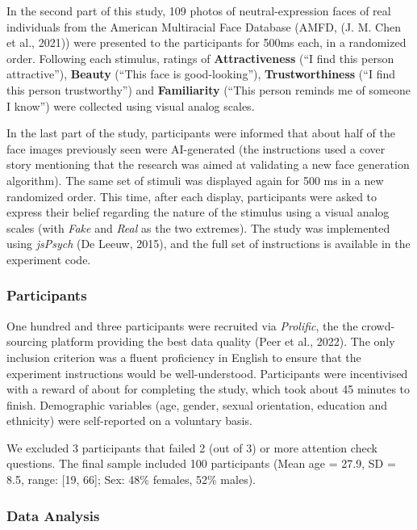 \documentclass[
  man,floatsintext]{apa6}
\begin{document}
In the second part of this study, 109 photos of neutral-expression faces of real individuals from the American Multiracial Face Database (AMFD, (J. M. Chen et al., 2021)) were presented to the participants for 500ms each, in a randomized order. Following each stimulus, ratings of \textbf{Attractiveness} (``I find this person attractive''), \textbf{Beauty} (``This face is good-looking''), \textbf{Trustworthiness} (``I find this person trustworthy'') and \textbf{Familiarity} (``This person reminds me of someone I know'') were collected using visual analog scales.

In the last part of the study, participants were informed that about half of the face images previously seen were AI-generated (the instructions used a cover story mentioning that the research was aimed at validating a new face generation algorithm). The same set of stimuli was displayed again for 500 ms in a new randomized order. This time, after each display, participants were asked to express their belief regarding the nature of the stimulus using a visual analog scales (with \emph{Fake} and \emph{Real} as the two extremes). The study was implemented using \emph{jsPsych} (De Leeuw, 2015), and the full set of instructions is available in the experiment code.

\hypertarget{participants}{%
\subsubsection{Participants}\label{participants}}

One hundred and three participants were recruited via \emph{Prolific}, the the crowd-sourcing platform providing the best data quality (Peer et al., 2022). The only inclusion criterion was a fluent proficiency in English to ensure that the experiment instructions would be well-understood. Participants were incentivised with a reward of about  for completing the study, which took about 45 minutes to finish. Demographic variables (age, gender, sexual orientation, education and ethnicity) were self-reported on a voluntary basis.

We excluded 3 participants that failed 2 (out of 3) or more attention check questions. The final sample included 100 participants (Mean age = 27.9, SD = 8.5, range: {[}19, 66{]}; Sex: 48\% females, 52\% males).

\hypertarget{data-analysis}{%
\subsubsection{Data Analysis}\label{data-analysis}}
\end{document}
